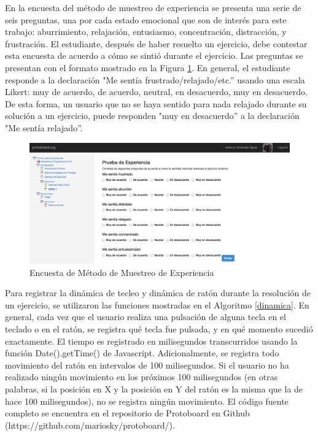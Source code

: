 En la encuesta del método de muestreo de experiencia se presenta una
serie de seis preguntas, una por cada estado emocional que son de
interés para este trabajo: aburrimiento, relajación, entusiasmo,
concentración, distracción, y frustración. El estudiante, después de
haber resuelto un ejercicio, debe contestar esta encuesta de acuerdo a
cómo se sintió durante el ejercicio. Las preguntas se presentan con el
formato mostrado en la Figura \ref{FigESM}. En general, el estudiante
responde a la declaración "Me sentía frustrado/relajado/etc.'' usando
una escala Likert: muy de acuerdo, de acuerdo, neutral, en desacuerdo,
muy en desacuerdo. De esta forma, un usuario que no se haya sentido
para nada relajado durante su solución a un ejercicio, puede responden
"muy en desacuerdo'' a la declaración "Me sentía relajado''.

\begin{figure}[htp]
  \centerline{\includegraphics[width=16.09cm]{esm.png}} \caption{Encuesta de Método de
    Muestreo de Experiencia
} \label{FigESM}
\end{figure}

Para registrar la dinámica de tecleo y dinámica de ratón durante la
resolución de un ejercicio, se utilizaron las funciones mostradas en
el Algoritmo \ref{dinamica}. En general, cada vez que el usuario realiza
una pulsación de alguna tecla en el teclado o en el ratón, se registra
qué tecla fue pulsada, y en qué momento sucedió exactamente. El tiempo
es registrado en milisegundos transcurridos usando la función
Date().getTime() de Javascript. Adicionalmente, se registra todo
movimiento del ratón en intervalos de 100 milisegundos. Si el usuario
no ha realizado ningún movimiento en los próximos 100 milisegundos (en
otras palabras, si la posición en X y la posición en Y del ratón es la
misma que la de hace 100 milisegundos), no se registra ningún
movimiento. El código fuente completo se encuentra en el repositorio de
Protoboard en Github (https://github.com/mariosky/protoboard/).

